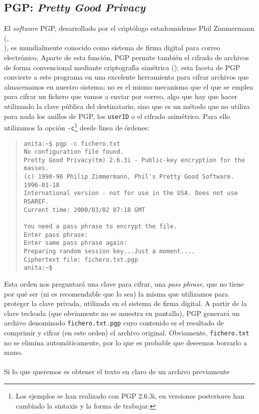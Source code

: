 \subsection{PGP: {\it Pretty Good Privacy}}
El {\it software} PGP, desarrollado por el cript\'ologo estadounidense Phil
Zimmermann (\cite{kn:zim95a},\\ \cite{kn:zim95b}), es mundialmente conocido 
como sistema de firma digital para 
correo electr\'onico. Aparte de esta funci\'on, PGP permite tambi\'en el 
cifrado de archivos de forma convencional mediante criptograf\'{\i}a 
sim\'etrica (\cite{kn:gar95}); esta faceta de PGP convierte a este programa en 
una excelente herramienta para cifrar archivos que almacenamos en nuestro 
sistema; no es el mismo mecanismo que el que se emplea para cifrar un fichero 
que vamos a enviar por correo, algo que
hay que hacer utilizando la clave p\'ublica del destinatario, sino que es un
m\'etodo que no utiliza para nada los anillos de PGP, los {\tt userID} o el 
cifrado asim\'etrico. Para ello utilizamos la opci\'on {\tt -c}\footnote{Los
ejemplos se han realizado con PGP 2.6.3i, en versiones posteriores han cambiado
la sintaxis y la forma de trabajar.} desde l\'{\i}nea de \'ordenes:
\begin{quote}
\begin{verbatim}
anita:~$ pgp -c fichero.txt
No configuration file found.
Pretty Good Privacy(tm) 2.6.3i - Public-key encryption for the masses.
(c) 1990-96 Philip Zimmermann, Phil's Pretty Good Software. 1996-01-18
International version - not for use in the USA. Does not use RSAREF.
Current time: 2000/03/02 07:18 GMT

You need a pass phrase to encrypt the file. 
Enter pass phrase: 
Enter same pass phrase again: 
Preparing random session key...Just a moment....
Ciphertext file: fichero.txt.pgp
anita:~$ 
\end{verbatim}
\end{quote}
Esta orden nos preguntar\'a una clave para cifrar, una {\it pass phrase}, que
no tiene por qu\'e ser (ni es recomendable que lo sea) la misma que utilizamos 
para proteger la clave privada, utilizada en el sistema de firma digital. A
partir de la clave tecleada (que obviamente no se muestra en pantalla), PGP 
generar\'a un archivo denominado {\tt fichero.txt.pgp} cuyo 
contenido es el resultado de comprimir y cifrar (en este orden) el archivo 
original. Obviamente, {\tt fichero.txt} no se elimina autom\'aticamente, por lo
que es probable que deseemos borrarlo a mano.\\
\\Si lo que queremos es obtener el texto en claro de un archivo previamente
